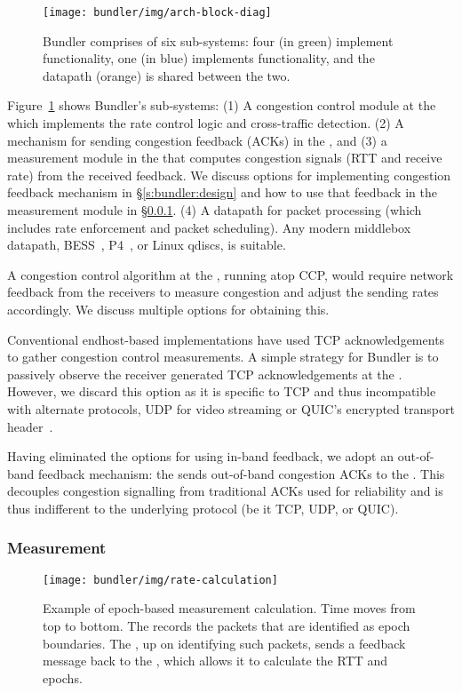 \begin{figure}
    \centering
    \texttt{[image: bundler/img/arch-block-diag]}
    \vspace{-40pt}
    \caption{Bundler comprises of six sub-systems: four (in green) implement \inbox functionality, one (in blue) implements \outbox functionality, and the datapath (orange) is shared between the two. }\label{fig:design:block-diag}
\end{figure}
Figure~\ref{fig:design:block-diag} shows Bundler's sub-systems: 
(1) A congestion control module at the \inbox which implements the rate control logic and cross-traffic detection.
(2) A mechanism for sending congestion feedback (ACKs) in the \outbox, and (3) a measurement module in the \inbox that computes congestion signals (RTT and receive rate) from the received feedback. We discuss options for implementing congestion feedback mechanism in \S\ref{s:bundler:design} and how to use that feedback in the measurement module in \S\ref{s:bundler:measurement}.
(4) A datapath for packet processing (which includes rate enforcement and packet scheduling). Any modern middlebox datapath, \eg BESS~\cite{bess}, P4~\cite{p4}, or  Linux qdiscs, is suitable. 

A congestion control algorithm at the \inbox, running atop CCP, would require network feedback from the receivers to measure congestion and adjust the sending rates accordingly. We discuss multiple options for obtaining this. 

Conventional endhost-based implementations have used TCP acknowledgements to gather congestion control measurements. A simple strategy for Bundler is to passively observe the receiver generated TCP acknowledgements at the \inbox. However, we discard this option as it is specific to TCP and thus incompatible with alternate protocols, \ie UDP for video streaming or QUIC's encrypted transport header~\cite{quic}.

 Having eliminated the options for using in-band feedback, we adopt an out-of-band feedback mechanism: the \outbox sends out-of-band congestion ACKs to the \inbox.
This decouples congestion signalling from traditional ACKs used for reliability and is thus indifferent to the underlying protocol (be it TCP, UDP, or QUIC).

\subsubsection{Measurement}\label{s:bundler:measurement}
\begin{figure}
    \centering
    \texttt{[image: bundler/img/rate-calculation]}
    \caption{Example of epoch-based measurement calculation. Time moves from top to bottom.
    The \inbox records the packets that are identified as epoch boundaries. 
    The \outbox, up on identifying such packets, sends a feedback message back to
    the \inbox, which allows it to calculate the RTT and epochs.
    }\label{fig:ratecalc}
\end{figure}

